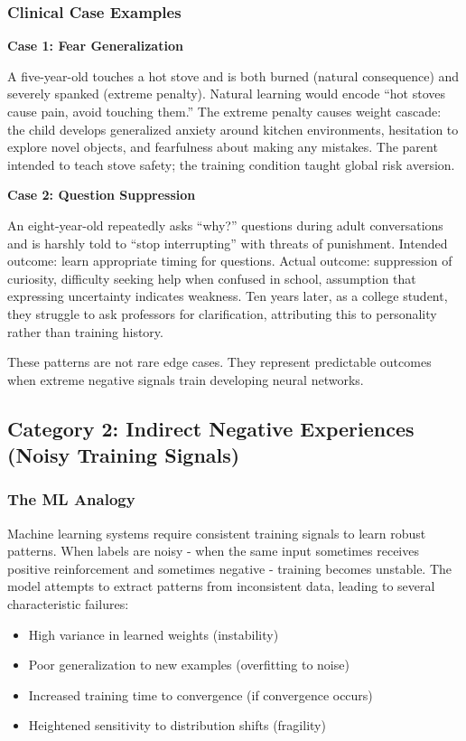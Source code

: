 \documentclass{article}
\begin{document}
\subsubsection{Clinical Case Examples}

\textbf{Case 1: Fear Generalization}

A five-year-old touches a hot stove and is both burned (natural consequence) and severely spanked (extreme penalty). Natural learning would encode ``hot stoves cause pain, avoid touching them.'' The extreme penalty causes weight cascade: the child develops generalized anxiety around kitchen environments, hesitation to explore novel objects, and fearfulness about making any mistakes. The parent intended to teach stove safety; the training condition taught global risk aversion.

\textbf{Case 2: Question Suppression}

An eight-year-old repeatedly asks ``why?'' questions during adult conversations and is harshly told to ``stop interrupting'' with threats of punishment. Intended outcome: learn appropriate timing for questions. Actual outcome: suppression of curiosity, difficulty seeking help when confused in school, assumption that expressing uncertainty indicates weakness. Ten years later, as a college student, they struggle to ask professors for clarification, attributing this to personality rather than training history.

These patterns are not rare edge cases. They represent predictable outcomes when extreme negative signals train developing neural networks.

\subsection{Category 2: Indirect Negative Experiences (Noisy Training Signals)}

\subsubsection{The ML Analogy}

Machine learning systems require consistent training signals to learn robust patterns. When labels are noisy - when the same input sometimes receives positive reinforcement and sometimes negative - training becomes unstable. The model attempts to extract patterns from inconsistent data, leading to several characteristic failures:

\begin{itemize}
\item High variance in learned weights (instability)
\item Poor generalization to new examples (overfitting to noise)
\item Increased training time to convergence (if convergence occurs)
\item Heightened sensitivity to distribution shifts (fragility)
\end{itemize}
\end{document}
